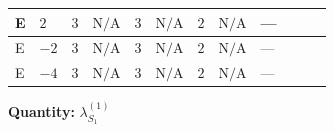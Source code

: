 \documentclass[8pt]{article}
\begin{document}
\begin{landscape}
\begin{longtable}{@{}llcccccc >{\raggedright\arraybackslash}p{0.21\linewidth} >{\raggedright\arraybackslash}p{0.21\linewidth} >{\raggedright\arraybackslash}p{0.21\linewidth}@{}}
\midrule
E & $2$ & $3$ & $\text{N/A}$ & $3$ & $\text{N/A}$ & $2$ & $\text{N/A}$ & --- & \scriptsize\adjustbox{max width=\linewidth}{$\begin{gathered} +6 {\lambda_{12}^{(1)}}^2\end{gathered}$} & \scriptsize\adjustbox{max width=\linewidth}{$\begin{gathered} +4 {\lambda_{HS_1}^{(1)}}^2\end{gathered}$} \\
\midrule
E & $-2$ & $3$ & $\text{N/A}$ & $3$ & $\text{N/A}$ & $2$ & $\text{N/A}$ & --- & \scriptsize\adjustbox{max width=\linewidth}{$\begin{gathered} +6 {\lambda_{12}^{(1)}}^2\end{gathered}$} & \scriptsize\adjustbox{max width=\linewidth}{$\begin{gathered} +4 {\lambda_{HS_1}^{(1)}}^2\end{gathered}$} \\
\midrule
E & $-4$ & $3$ & $\text{N/A}$ & $3$ & $\text{N/A}$ & $2$ & $\text{N/A}$ & --- & \scriptsize\adjustbox{max width=\linewidth}{$\begin{gathered} +6 {\lambda_{12}^{(1)}}^2\end{gathered}$} & \scriptsize\adjustbox{max width=\linewidth}{$\begin{gathered} +4 {\lambda_{HS_1}^{(1)}}^2\end{gathered}$} \\
\midrule
\bottomrule
\end{longtable}
\clearpage
\noindent\textbf{Quantity: }$\lambda_{S_1}^{(1)}$\par\smallskip

\end{landscape}
\end{document}
